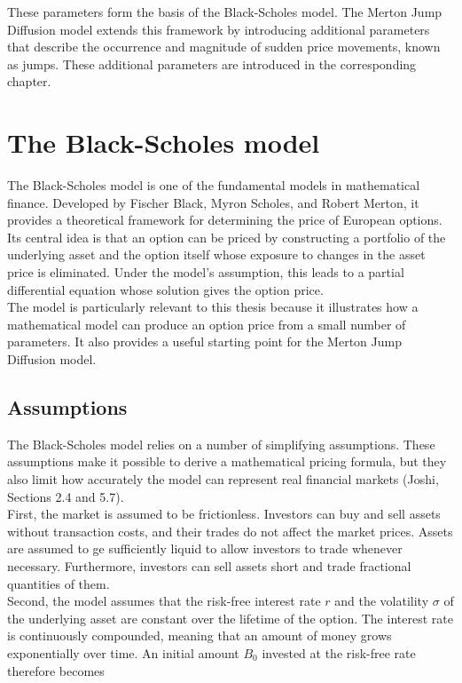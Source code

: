 \documentclass{article}
\begin{document}
	These parameters form the basis of the Black-Scholes model. The Merton Jump Diffusion model extends this framework by introducing additional parameters that describe the occurrence and magnitude of sudden price movements, known as jumps. These additional parameters are introduced in the corresponding chapter.
	
	\section{The Black-Scholes model}
	
	The Black-Scholes model is one of the fundamental models in mathematical finance. Developed by Fischer Black, Myron Scholes, and Robert Merton, it provides a theoretical framework for determining the price of European options. Its central idea is that an option can be priced by constructing a portfolio of the underlying asset and the option itself whose exposure to changes in the asset price is eliminated. Under the model's assumption, this leads to a partial differential equation whose solution gives the option price. \\
	The model is particularly relevant to this thesis because it illustrates how a mathematical model can produce an option price from a small number of parameters. It also provides a useful starting point for the Merton Jump Diffusion model.
	
	\subsection{Assumptions}
	
	The Black-Scholes model relies on a number of simplifying assumptions. These assumptions make it possible to derive a mathematical pricing formula, but they also limit how accurately the model can represent real financial markets (Joshi, Sections 2.4 and 5.7).\\
	First, the market is assumed to be frictionless. Investors can buy and sell assets without transaction costs, and their trades do not affect the market prices. Assets are assumed to ge sufficiently liquid to allow investors to trade whenever necessary. Furthermore, investors can sell assets short and trade fractional quantities of them.\\
	Second, the model assumes that the risk-free interest rate $r$ and the volatility $\sigma$ of the underlying asset are constant over the lifetime of the option. The interest rate is continuously compounded, meaning that an amount of money grows exponentially over time. An initial amount $B_0$ invested at the risk-free rate therefore becomes
	
\end{document}
